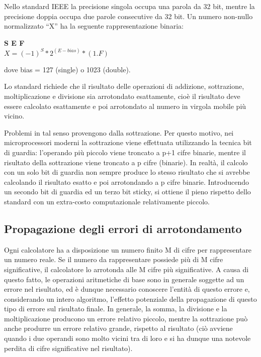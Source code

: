 Nello standard IEEE la precisione singola occupa una parola da 32 bit, mentre la precisione doppia occupa due parole consecutive da 32 bit. Un numero non-nullo normalizzato ``X'' ha la seguente rappresentazione binaria:

\begin{center}
	\textbf{S E F}
	\\
	$X  =  (-1)^S  *  2^(E-bias)  *  (1.F)$
	\end{center}

dove bias = 127 (single) o 1023 (double).

Lo standard richiede che il risultato delle operazioni di addizione, sottrazione, moltiplicazione e divisione sia arrotondato esattamente, cioè il risultato deve essere calcolato esattamente e poi arrotondato al numero in virgola mobile più vicino.

Problemi in tal senso provengono dalla sottrazione. Per questo motivo, nei microprocessori moderni la sottrazione viene effettuata utilizzando la tecnica bit di guardia:  l'operando più piccolo viene troncato a p+1 cifre binarie, mentre il risultato della sottrazione viene troncato a p cifre (binarie). In realtà, il calcolo con un solo bit di guardia non sempre produce lo stesso risultato che si avrebbe calcolando il risultato esatto e poi arrotondando a p cifre binarie. Introducendo un secondo bit di guardia ed un terzo bit sticky, si ottiene il pieno rispetto dello standard con un extra-costo computazionale relativamente piccolo.

\subsection{Propagazione degli errori di arrotondamento}

Ogni calcolatore ha a disposizione un numero finito M di cifre per rappresentare un numero reale. Se il numero da rappresentare possiede più di M cifre significative, il calcolatore lo arrotonda alle M cifre più significative. A causa di questo fatto, le operazioni aritmetiche di base sono in generale soggette ad un errore nel risultato, ed è dunque necessario conoscere l’entità di questo errore e, considerando un intero algoritmo,  l’effetto potenziale della propagazione di questo tipo di errore sul risultato finale.
In generale, la somma, la divisione e la moltiplicazione producono un errore relativo piccolo, mentre la sottrazione può anche produrre un errore relativo grande, rispetto al risultato (ciò avviene quando i due operandi sono molto vicini tra di loro e si ha dunque una notevole perdita di cifre significative nel risultato).

